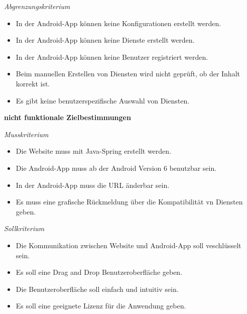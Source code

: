 \textit{Abgrenzungskriterium}

\begin{itemize}[leftmargin=4pc]
	\item In der Android-App können keine Konfigurationen erstellt werden.
	\item In der Android-App können keine Dienste erstellt werden.
	\item In der Android-App können keine Benutzer registriert werden.
	\item Beim manuellen Erstellen von Diensten wird nicht geprüft, ob der Inhalt korrekt ist.
	\item Es gibt keine benutzerspezifische Auswahl von Diensten.\\
\end{itemize}


\textbf{nicht funktionale Zielbestimmungen}\newline

\textit{Musskriterium}

\begin{itemize}[leftmargin=4pc]
	\item Die Website muss mit Java-Spring erstellt werden.
	\item Die Android-App muss ab der Android Version 6 benutzbar sein.
	\item In der Android-App muss die URL änderbar sein.
	\item Es muss eine grafische Rückmeldung über die Kompatibilität vn Diensten geben.
\end{itemize}

\textit{Sollkriterium}

\begin{itemize}[leftmargin=4pc]
	\item Die Kommunikation zwischen Website und Android-App soll veschlüsselt sein.
	\item Es soll eine Drag and Drop Benutzeroberfläche geben.
	\item Die Benutzeroberfläche soll einfach und intuitiv sein.
	\item Es soll eine geeignete Lizenz für die Anwendung geben.
\end{itemize}